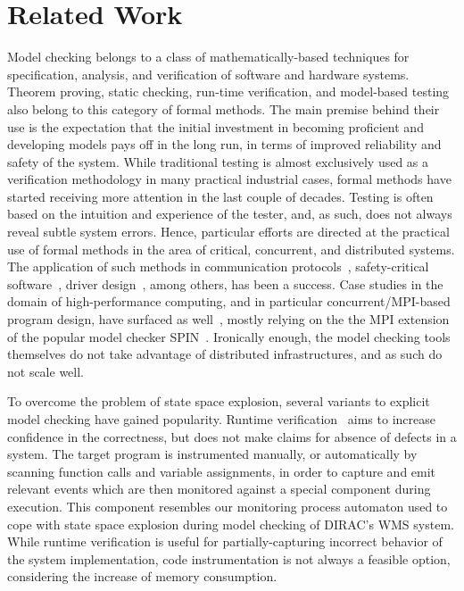 \documentclass[sort&compress,preprint,3p]{elsarticle}
\begin{document}
\section{Related Work}
\label{sec:RelatedWork}
Model checking belongs to a class of mathematically-based techniques for specification, analysis,
and verification of software and hardware systems. Theorem proving, static checking, run-time verification, and model-based testing
also belong to this category of formal methods. The main premise behind their use is the expectation that
the initial investment in becoming proficient and developing models pays off in the long run, in terms 
of improved reliability and safety of the system. While traditional testing is almost
exclusively used as a verification methodology in many practical industrial cases,
formal methods have started receiving more attention in the last couple of decades. 
Testing is often based on the intuition and experience of the tester, and, as such, does not 
always reveal subtle system errors. Hence, particular efforts are directed at
the practical use of formal methods in the area of critical, concurrent, and distributed 
systems.
The application of such methods in communication protocols~\cite{SPIN_case_study,SlidingWindowProtocol,sessionMgmtMasterThesis}, 
safety-critical software~\cite{Java_PathFinder,CMS_LHC,Mathijssen:2006:VDA:1757571.1757584},
driver design~\cite{Ball04slamand,Linux_driver}, among others, has been a success.
Case studies in the domain of high-performance computing, and in particular concurrent/MPI-based program design,
have surfaced as well~\cite{Siegel04verificationof,Matlin:2002:SPS:645881.672236,Siegel:2007:MCN:1763048.1763053}, mostly 
relying on the the MPI extension of the popular model checker SPIN~\cite{Siegel:2007:VPP:2396095.2396105}.
Ironically enough, the model checking tools themselves do not take advantage of distributed infrastructures, and 
as such do not scale well. 

To overcome the problem of state space explosion, several
variants to explicit model checking have gained popularity. Runtime
verification~\cite{DBLP:conf/dagstuhl/ColinM04,Havelund:2008:RVC:1424465.1424470}
aims to increase confidence in the correctness, but does not make claims for
absence of defects in a system.
The target program is instrumented manually, or automatically by scanning
function calls and variable assignments, 
in order to capture and emit relevant events which are then monitored against a
special component during execution.
This component resembles our monitoring process automaton used to cope with
state space explosion during model checking 
of DIRAC's WMS system. While runtime verification is useful for
partially-capturing incorrect behavior of the system implementation, 
code instrumentation is not always a feasible option, considering the increase
of memory consumption. 
\end{document}
